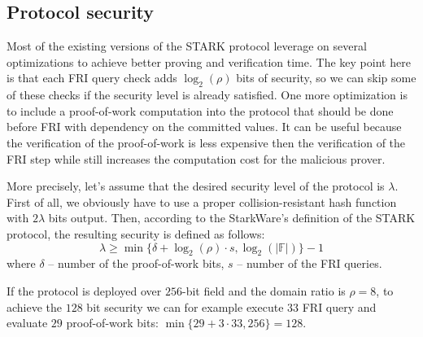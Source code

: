 \documentclass[../lecture-notes-148x210.tex]{subfiles}
\begin{document}
\subsection{Protocol security}
Most of the existing versions of the STARK protocol leverage on several
optimizations to achieve better proving and verification time. The key point
here is that each FRI query check adds $\log_2(\rho)$ bits of security, so we can
skip some of these checks if the security level is already satisfied. One more
optimization is to include a proof-of-work computation into the protocol that
should be done before FRI with dependency on the committed values. It can be
useful because the verification of the proof-of-work is less expensive then the
verification of the FRI step while still increases the computation cost for the
malicious prover. 

More precisely, let's assume that the desired security level of the protocol is
$\lambda$. First of all, we obviously have to use a proper collision-resistant
hash function with $2\lambda$ bits output. Then, according to the StarkWare's
definition of the STARK protocol, the resulting security is defined as follows:
\begin{equation*}
    \lambda \geq \min\{ \delta + \log_2(\rho) \cdot s, \log_2(|\mathbb{F}|) \} - 1
\end{equation*}
where $\delta$ -- number of the proof-of-work bits, $s$ -- number of the FRI queries.

\begin{example}
If the protocol is deployed over $256$-bit field and the domain ratio is $\rho =
8$, to achieve the $128$ bit security we can for example execute $33$ FRI query
and evaluate $29$ proof-of-work bits: $\min\{29+3\cdot 33, 256\} = 128$. 
\end{example}
\end{document}

